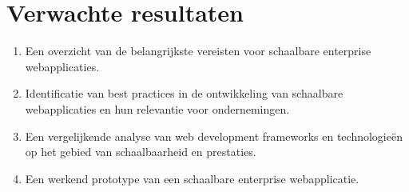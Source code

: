 \documentclass{hogent-article}
\begin{document}
\section{Verwachte resultaten}
\begin{enumerate}
  \item Een overzicht van de belangrijkste vereisten voor schaalbare enterprise webapplicaties.
  \item Identificatie van best practices in de ontwikkeling van schaalbare webapplicaties en hun relevantie voor ondernemingen.
  \item Een vergelijkende analyse van web development frameworks en technologieën op het gebied van schaalbaarheid en prestaties.
  \item Een werkend prototype van een schaalbare enterprise webapplicatie.
\end{enumerate}



\tableofcontents
\end{document}
